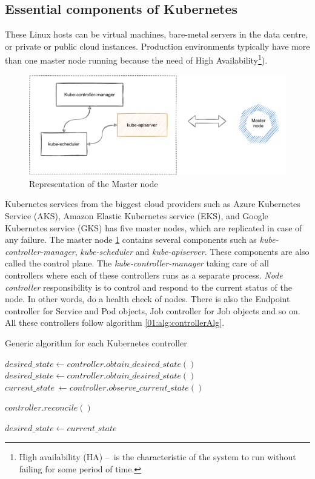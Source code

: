 \subsection{Essential components of Kubernetes}
These Linux hosts can be virtual machines, bare-metal servers in the data centre, or private or public cloud instances. Production environments typically have more than one master node running because the need of High Availability\footnote{High availability (HA) \---\ is the characteristic of the system to run without failing for some period of time.}). 
\begin{figure}[!h]
    \centering
    \includegraphics[scale=0.82]{obrazky-figures/02-preliminaries/01-kubernetes/02-architecture-master-sketch.pdf}
    \caption{Representation of the Master node}
    \label{02:fig:masterNode}
\end{figure}
Kubernetes services from the biggest cloud providers such as Azure Kubernetes Service (AKS), Amazon Elastic Kubernetes service (EKS), and Google Kubernetes service (GKS) has five master nodes, which are replicated in case of any failure. The master node \ref{02:fig:masterNode} contains several components such as \emph{kube-controller-manager}, \emph{kube-scheduler} and \emph{kube-apiserver}. These components are also called the control plane. The \emph{kube-controller-manager} taking care of all controllers where each of these controllers runs as a separate process. \emph{Node controller} responsibility is to control and respond to the current status of the node. In other words, do a health check of nodes. There is also the Endpoint controller for Service and Pod objects, Job controller for Job objects and so on. All these controllers follow algorithm \ref{01:alg:controllerAlg}.
\begin{algorithm}[H]
\label{01:alg:controllerAlg}
\caption{Generic algorithm for each Kubernetes controller}

    \begin{algorithmic}[1]
        \State $desired\_state \gets controller.obtain\_desired\_state()$
            \State $desired\_state \gets controller.obtain\_desired\_state()$
            \State $current\_state\ \gets controller.observe\_current\_state()$
            
                \State $controller.reconcile()$
            \EndIf
    
           \State $desired\_state \gets current\_state$
        \EndWhile
    \end{algorithmic}
\end{algorithm}
